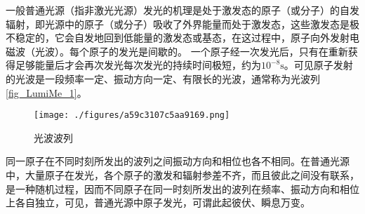 
一般普通光源（指非激光光源）发光的机理是处于激发态的原子（或分子）的自发辐射，即光源中的原子（或分子）吸收了外界能量而处于激发态，这些激发态是极不稳定的，它会自发地回到低能量的激发态或基态，在这过程中，原子向外发射电磁波（光波）。每个原子的发光是间歇的。 一个原子经一次发光后，只有在重新获得足够能量后才会再次发光每次发光的持续时间极短，约为$10^{-8}\mathrm s$。可见原子发射的光波是一段频率一定、振动方向一定、有限长的光波，通常称为光波列\autoref{fig_LumiMe_1}。
\begin{figure}[ht]
\centering
\texttt{[image: ./figures/a59c3107c5aa9169.png]}
\caption{光波波列} \label{fig_LumiMe_1}
\end{figure}

同一原子在不同时刻所发出的波列之间振动方向和相位也各不相同。在普通光源中，大量原子在发光，各个原子的激发和辐射参差不齐，而且彼此之间没有联系，是一种随机过程，因而不同原子在同一时刻所发出的波列在频率、振动方向和相位上各自独立，可见，普通光源中原子发光，可谓此起彼伏、瞬息万变。